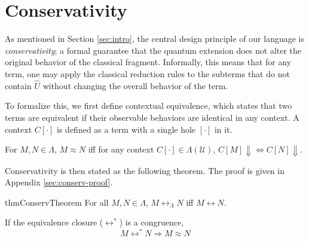 \section{Conservativity}
As mentioned in Section \ref{sec:intro}, the central design principle of our language is \textit{conservativity}; a formal guarantee that the quantum extension does not alter the original behavior of the classical fragment.
Informally, this means that for any term, one may apply the classical reduction rules to the subterms that do not contain $\hat{U}$ without changing the overall behavior of the term.

To formalize this, we first define contextual equivalence, which states that two terms are equivalent if their observable behaviors are identical in any context.
A context $C[\cdot]$ is defined as a term with a single hole $[\cdot]$ in it.
\begin{dfn} \label{def:contextual-equiv}
  For $M, N \in \Lambda$, $M\approx N$ iff for any context $C[\cdot]\in\Lambda(\mathcal{U})$, $C[M] \Downarrow \Leftrightarrow C[N] \Downarrow$.
\end{dfn}

Conservativity is then stated as the following theorem. The proof is given in Appendix \ref{sec:conserv-proof}.
\begin{restatable}[Conservativity]{thm}{ConservTheorem} \label{thm:conservativity}
  For all $M, N \in \Lambda$, $M \leftrightarrow_\Lambda N$ iff $M \leftrightarrow N$.
\end{restatable}

If the equivalence closure ($\leftrightarrow^*$) is a congruence,
\begin{equation*}
  M \leftrightarrow^* N \Rightarrow M \approx N
\end{equation*}